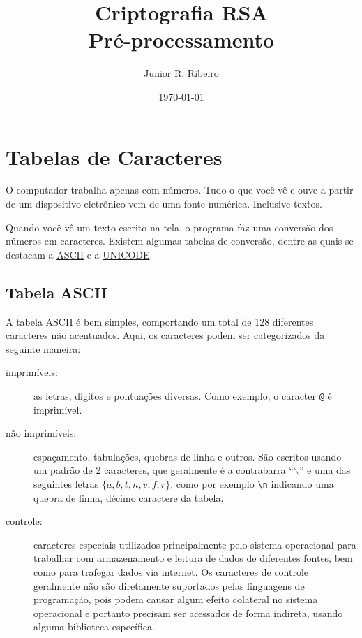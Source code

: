 \documentclass[12pt,a4paper]{article}
\title{Criptografia RSA\\Pré-processamento}
\author{Junior R. Ribeiro}
\date{\today}
\begin{document}
\maketitle
  
\section{Tabelas de Caracteres}

O computador trabalha apenas com números. Tudo o que você vê e ouve a partir de um dispositivo eletrônico vem de uma fonte numérica. Inclusive textos.

Quando você vê um texto escrito na tela, o programa faz uma conversão dos números em caracteres. Existem algumas tabelas de conversão, dentre as quais se destacam a \href{https://pt.wikipedia.org/wiki/ASCII}{ASCII} e a \href{https://pt.wikipedia.org/wiki/Unicode}{UNICODE}.

\subsection{Tabela ASCII}
A tabela ASCII é bem simples, comportando um total de 128 diferentes caracteres não acentuados. Aqui, os caracteres podem ser categorizados da seguinte maneira:

\begin{description}
\item[imprimíveis:] as letras, dígitos e pontuações diversas. Como exemplo, o caracter {\color{red}\verb|@|} é imprimível.
\item[não imprimíveis:] espaçamento, tabulações, quebras de linha e outros. São escritos usando um padrão de 2 caracteres, que geralmente é a contrabarra ``$\backslash$'' e uma das seguintes letras \newline $\{a, b, t, n, v, f, r\}$, como por exemplo {\color{red}\verb|\n|} indicando uma quebra de linha, décimo caractere da tabela. 
\item[controle:] caracteres especiais utilizados principalmente pelo sistema operacional para trabalhar com armazenamento e leitura de dados de diferentes fontes, bem como para trafegar dados via internet. Os caracteres de controle geralmente não são diretamente suportados pelas linguagens de programação, pois podem causar algum efeito colateral no sistema operacional e portanto precisam ser acessados de forma indireta, usando alguma biblioteca específica.
\end{description} 
\end{document}
